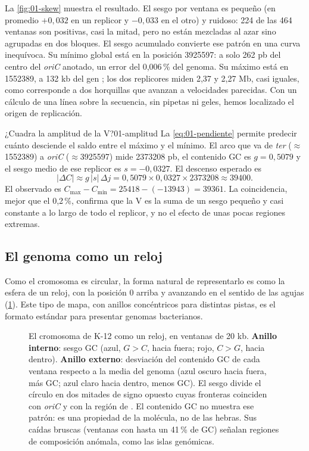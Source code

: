 La \cref{fig:01-skew} muestra el resultado. El sesgo por ventana es pequeño (en promedio $+0{,}032$ en un replicor y $-0{,}033$ en el otro) y ruidoso: 224 de las 464 ventanas son positivas, casi la mitad, pero no están mezcladas al azar sino agrupadas en dos bloques. El sesgo acumulado convierte ese patrón en una curva inequívoca. Su mínimo global está en la posición \num{3925597}: a solo 262 pb del centro del \emph{oriC} anotado, un error del 0,006\,\% del genoma. Su máximo está en \num{1552389}, a 132 kb del gen ; los dos replicores miden 2,37 y 2,27 Mb, casi iguales, como corresponde a dos horquillas que avanzan a velocidades parecidas. Con un cálculo de una línea sobre la secuencia, sin pipetas ni geles, hemos localizado el origen de replicación.

\begin{ejemplo}{¿Cuadra la amplitud de la V?}{01-amplitud}
La \cref{eq:01-pendiente} permite predecir cuánto desciende el saldo entre el máximo y el mínimo. El arco que va de \emph{ter} ($\approx$\num{1552389}) a \emph{oriC} ($\approx$\num{3925597}) mide \num{2373208} pb, el contenido GC es $g=0{,}5079$ y el sesgo medio de ese replicor es $s=-0{,}0327$. El descenso esperado es
\[
|\Delta C| \approx g\,|s|\,\Delta j = 0{,}5079\times0{,}0327\times\num{2373208}\approx \num{39400}.
\]
El observado es $C_{\max}-C_{\min} = \num{25418}-(-\num{13943}) = \num{39361}$. La coincidencia, mejor que el 0,2\,\%, confirma que la V es la suma de un sesgo pequeño y casi constante a lo largo de todo el replicor, y no el efecto de unas pocas regiones extremas.
\end{ejemplo}

\subsection{El genoma como un reloj}

Como el cromosoma es circular, la forma natural de representarlo es como la esfera de un reloj, con la posición 0 arriba y avanzando en el sentido de las agujas (\cref{fig:01-mapa}). Este tipo de mapa, con anillos concéntricos para distintas pistas, es el formato estándar para presentar genomas bacterianos.

\begin{figure}[t]
\centering

\caption[Mapa circular de \emph{E.\,coli}]{El cromosoma de  K-12 como un reloj, en ventanas de 20 kb. \textbf{Anillo interno}: sesgo GC (azul, $G>C$, hacia fuera; rojo, $C>G$, hacia dentro). \textbf{Anillo externo}: desviación del contenido GC de cada ventana respecto a la media del genoma (azul oscuro hacia fuera, más GC; azul claro hacia dentro, menos GC). El sesgo divide el círculo en dos mitades de signo opuesto cuyas fronteras coinciden con \emph{oriC} y con la región de . El contenido GC no muestra ese patrón: es una propiedad de la molécula, no de las hebras. Sus caídas bruscas (ventanas con hasta un 41\,\% de GC) señalan regiones de composición anómala, como las islas genómicas.}
\label{fig:01-mapa}
\end{figure}

